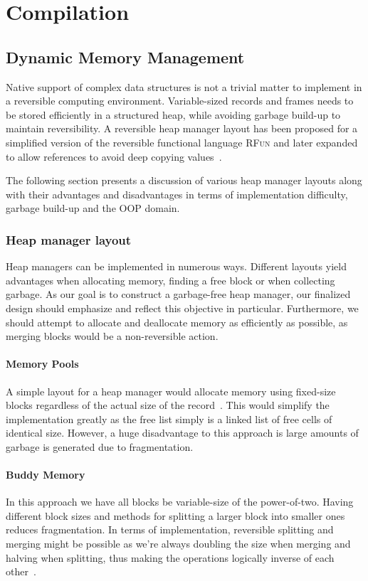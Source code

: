 \chapter{Compilation}

\section{Dynamic Memory Management}
Native support of complex data structures is not a trivial matter to implement in a reversible computing environment. Variable-sized records and frames needs to be stored efficiently in a structured heap, while avoiding garbage build-up to maintain reversibility. A reversible heap manager layout has been proposed for a simplified version of the reversible functional language \textsc{RFun} and later expanded to allow references to avoid deep copying values~\cite{ha:heap, ty:rfun, tm:refcounting}.

The following section presents a discussion of various heap manager layouts along with their advantages and disadvantages in terms of implementation difficulty, garbage build-up and the OOP domain. 

\subsection{Heap manager layout}
Heap managers can be implemented in numerous ways. Different layouts yield advantages when allocating memory, finding a free block or when collecting garbage. As our goal is to construct a garbage-free heap manager, our finalized design should emphasize and reflect this objective in particular. Furthermore, we should attempt to allocate and deallocate memory as efficiently as possible, as merging blocks would be a non-reversible action.

\subsubsection{Memory Pools}
A simple layout for a heap manager would allocate memory using fixed-size blocks regardless of the actual size of the record~\cite{bk:memorypool}. This would simplify the implementation greatly as the free list simply is a linked list of free cells of identical size. However, a huge disadvantage to this approach is large amounts of garbage is generated due to fragmentation.

\subsubsection{Buddy Memory}
In this approach we have all blocks be variable-size of the power-of-two. Having different block sizes and methods for splitting a larger block into smaller ones reduces fragmentation. In terms of implementation, reversible splitting and merging might be possible as we're always doubling the size when merging and halving when splitting, thus making the operations logically inverse of each other~\cite{dk:buddyalloc}.

